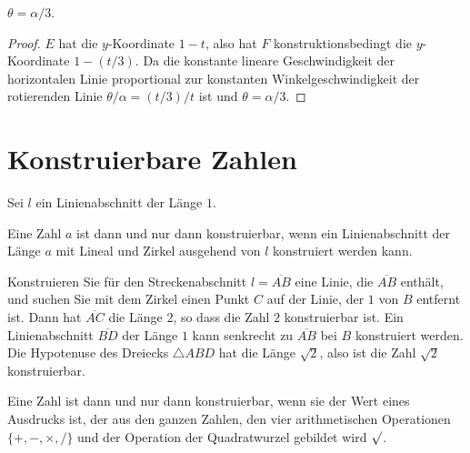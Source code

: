 \begin{theorem}
$\theta = \alpha/3$.
\end{theorem}
\begin{proof}
$E$ hat die $y$-Koordinate $1-t$, also hat $F$ konstruktionsbedingt die $y$-Koordinate $1-(t/3)$. Da die konstante lineare Geschwindigkeit der horizontalen Linie proportional zur konstanten Winkelgeschwindigkeit der rotierenden Linie $\theta/\alpha = (t/3)/t$ ist und $\theta = \alpha/3$.
\end{proof}

\section{Konstruierbare Zahlen}\label{s.trisect-constructible}

Sei $l$ ein Linienabschnitt der Länge $1$.

\begin{definition}
Eine Zahl $a$ ist dann und nur dann konstruierbar, wenn ein Linienabschnitt der Länge $a$ mit Lineal und Zirkel ausgehend von $l$ konstruiert werden kann.
\end{definition}

Konstruieren Sie für den Streckenabschnitt $l=\overline{AB}$ eine Linie, die $\overline{AB}$ enthält, und suchen Sie mit dem Zirkel einen Punkt $C$ auf der Linie, der $1$ von $B$ entfernt ist. Dann hat $\overline{AC}$ die Länge $2$, so dass die Zahl $2$ konstruierbar ist. Ein Linienabschnitt $\overline{BD}$ der Länge $1$ kann senkrecht zu $\overline{AB}$ bei $B$ konstruiert werden. Die Hypotenuse des Dreiecks $\triangle ABD$ hat die Länge $\sqrt{2}$, also ist die Zahl $\sqrt{2}$ konstruierbar.

\begin{theorem}\label{thm.trisect-constructible}
Eine Zahl ist dann und nur dann konstruierbar, wenn sie der Wert eines Ausdrucks ist, der aus den ganzen Zahlen, den vier arithmetischen Operationen $\{+,-,\times,/\}$ und der Operation der Quadratwurzel gebildet wird $\surd$.
\end{theorem}

